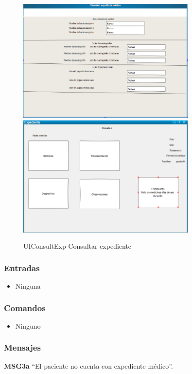 \begin{figure}[htbp!]
        \centering
        \includegraphics[width=0.8\textwidth]{images/UIEXP3}
            \includegraphics[width=0.8\textwidth]{images/UIEXP4}
        \caption{UIConsultExp Consultar expediente}
\end{figure}
\newpage
\subsubsection{Entradas}
\begin{itemize}
\item Ninguna
\end{itemize}

\subsubsection{Comandos}
\begin{itemize}
\item Ninguno
\end{itemize}

\subsubsection{Mensajes}
    \begin{Citemize}
        \item {\bf MSG3a} ``El paciente no cuenta con expediente médico''.
    \end{Citemize}


